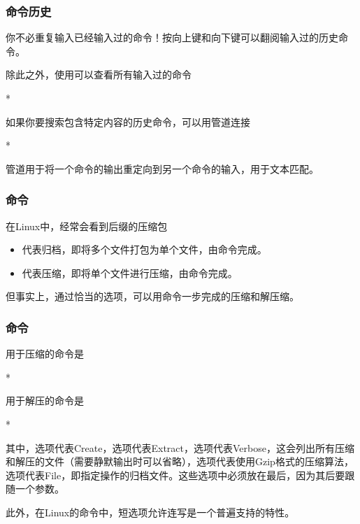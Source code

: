 \begin{frame}
    \frametitle{命令历史}
    你不必重复输入已经输入过的命令！按向上键和向下键可以翻阅输入过的历史命令。

    除此之外，使用可以查看所有输入过的命令
    \begin{Code}*
        
    \end{Code}

    如果你要搜索包含特定内容的历史命令，可以用管道\code{|}连接
    \begin{Code}*
        
    \end{Code}

    管道\code{|}用于将一个命令的输出重定向到另一个命令的输入，用于文本匹配。
\end{frame}

\begin{frame}
    \frametitle{命令}
    在Linux中，经常会看到后缀的压缩包
    \begin{itemize}
        \item {}代表归档，即将多个文件打包为单个文件，由命令完成。
        \item {}代表压缩，即将单个文件进行压缩，由命令完成。
    \end{itemize}
    但事实上，通过恰当的选项，可以用命令一步完成的压缩和解压缩。
\end{frame}

\begin{frame}
    \frametitle{命令}
    用于压缩的命令是
    \begin{Code}*
        
    \end{Code}
    用于解压的命令是
    \begin{Code}*
        
    \end{Code}
    其中，选项代表Create，选项代表Extract，选项代表Verbose，这会列出所有压缩和解压的文件（需要静默输出时可以省略），选项代表使用Gzip格式的压缩算法，选项代表File，即指定操作的归档文件。这些选项中必须放在最后，因为其后要跟随一个参数。
    
    此外，在Linux的命令中，短选项允许连写是一个普遍支持的特性。
\end{frame}